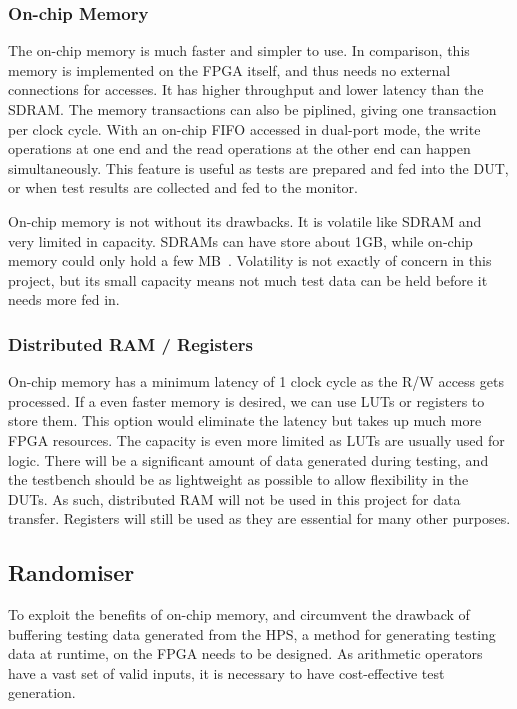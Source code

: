 \subsubsection{\textbf{On-chip Memory}}
The on-chip memory is much faster and simpler to use.
In comparison, this memory is implemented on the FPGA itself, and thus needs
no external connections for accesses.
It has higher throughput and lower latency than the SDRAM.
The memory transactions can also be piplined, giving one transaction per
clock cycle.
With an on-chip FIFO accessed in dual-port mode, the write operations at one
end and the read operations at the other end can happen simultaneously.
This feature is useful as tests are prepared and fed into the DUT, or when test
results are collected and fed to the monitor.

On-chip memory is not without its drawbacks.
It is volatile like SDRAM and very limited in capacity.
SDRAMs can have store about 1GB, while on-chip memory could only hold a few
MB~\cite{Altera2}.
Volatility is not exactly of concern in this project, but its small capacity
means not much test data can be held before it needs more fed in.

\subsubsection{\textbf{Distributed RAM / Registers}}
On-chip memory has a minimum latency of 1 clock cycle as the R/W access gets
processed.
If a even faster memory is desired, we can use LUTs or registers to store them.
This option would eliminate the latency but takes up much more FPGA resources.
The capacity is even more limited as LUTs are usually used for logic.
There will be a significant amount of data generated during testing, and the
testbench should be as lightweight as possible to allow flexibility in the DUTs.
As such, distributed RAM will not be used in this project for data transfer.
Registers will still be used as they are essential for many other purposes.

\subsection{Randomiser}
To exploit the benefits of on-chip memory, and circumvent the drawback of
buffering testing data generated from the HPS, a method for generating testing
data at runtime, on the FPGA needs to be designed.
As arithmetic operators have a vast set of valid inputs, it is necessary to
have cost-effective test generation.

